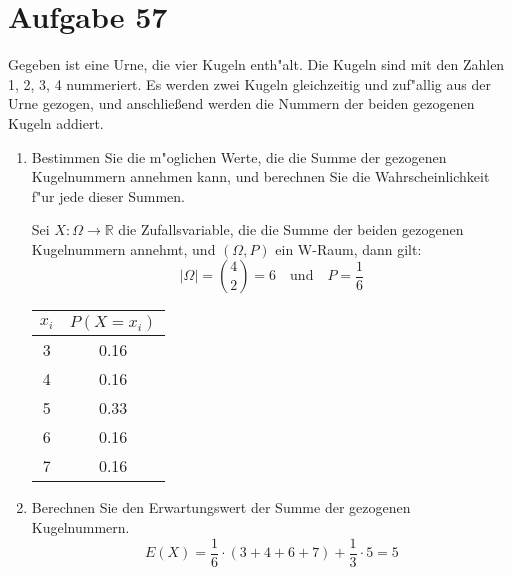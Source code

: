 \section{Aufgabe 57}
\setcounter{section}{57}

Gegeben ist eine Urne, die vier Kugeln enth"alt. Die Kugeln sind mit den Zahlen
1, 2, 3, 4 nummeriert. Es werden zwei Kugeln gleichzeitig und zuf"allig aus der
Urne gezogen, und anschlie{\ss}end werden die Nummern der beiden gezogenen
Kugeln addiert.
\begin{enumerate}
    \item Bestimmen Sie die m"oglichen Werte, die die Summe der gezogenen
        Kugelnummern annehmen kann, und berechnen Sie die Wahrscheinlichkeit
        f"ur jede dieser Summen.

        Sei $X : \Omega \rightarrow \mathbb{R}$ die Zufallsvariable, die die
        Summe der beiden gezogenen Kugelnummern annehmt, und $(\Omega, P)$ ein
        W-Raum, dann gilt:
        \begin{equation*}
            |\Omega| = \binom{4}{2} = 6 \quad\text{und}\quad P = \dfrac{1}{6}
        \end{equation*}
        \begin{table*}[h]
            \centering
            \begin{tabular}{c|c}
                $x_i$ & $P(X = x_i)$ \\
                \hline
                3 & 0.16 \\
                4 & 0.16 \\
                5 & 0.33 \\
                6 & 0.16 \\
                7 & 0.16 \\
            \end{tabular}
        \end{table*}
    \item Berechnen Sie den Erwartungswert der Summe der gezogenen Kugelnummern.
        \begin{equation*}
            E(X) = \dfrac{1}{6} \cdot (3 + 4 + 6 + 7) + \dfrac{1}{3} \cdot 5 = 5
        \end{equation*}
\end{enumerate}
